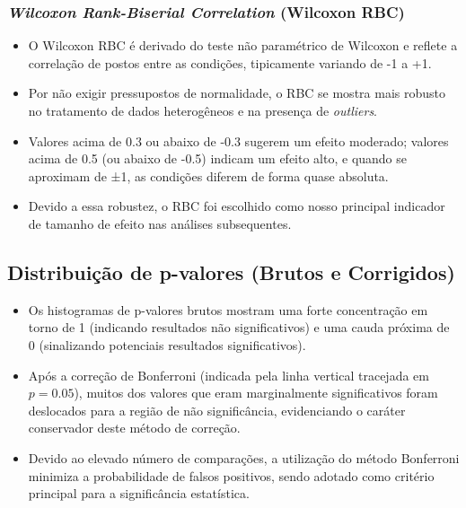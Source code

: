 \subsubsection{\textit{Wilcoxon Rank-Biserial Correlation} (Wilcoxon RBC)}
\begin{itemize}
    \item O Wilcoxon RBC é derivado do teste não paramétrico de Wilcoxon e reflete a correlação de postos entre as condições, tipicamente variando de -1 a +1.
    \item Por não exigir pressupostos de normalidade, o RBC se mostra mais robusto no tratamento de dados heterogêneos e na presença de \textit{outliers}.
    \item Valores acima de 0.3 ou abaixo de -0.3 sugerem um efeito moderado; valores acima de 0.5 (ou abaixo de -0.5) indicam um efeito alto, e quando se aproximam de ±1, as condições diferem de forma quase absoluta.
    \item Devido a essa robustez, o RBC foi escolhido como nosso principal indicador de tamanho de efeito nas análises subsequentes.
\end{itemize}

\subsection{Distribuição de p-valores (Brutos e Corrigidos)}
\begin{itemize}
    \item Os histogramas de p-valores brutos mostram uma forte concentração em torno de 1 (indicando resultados não significativos) e uma cauda próxima de 0 (sinalizando potenciais resultados significativos).
    \item Após a correção de Bonferroni (indicada pela linha vertical tracejada em \(p=0.05\)), muitos dos valores que eram marginalmente significativos foram deslocados para a região de não significância, evidenciando o caráter conservador deste método de correção.
    \item Devido ao elevado número de comparações, a utilização do método Bonferroni minimiza a probabilidade de falsos positivos, sendo adotado como critério principal para a significância estatística.
\end{itemize}


